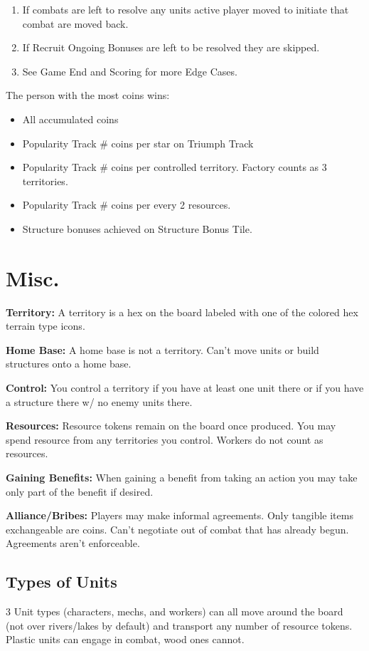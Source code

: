 \documentclass[12pt]{article}
\newenvironment{enumerateCustom}
{\begin{enumerate}
  \setlength{\itemsep}{1pt}
  \setlength{\parskip}{0pt}
  \setlength{\parsep}{0pt}}
{\end{enumerate}}
\newenvironment{itemizeCustom}
{\begin{itemize}
  \setlength{\itemsep}{1pt}
  \setlength{\parskip}{0pt}
  \setlength{\parsep}{0pt}}
{\end{itemize}}
\begin{document}
\begin{multicols*}{2}
\begin{enumerateCustom}
    \item If combats are left to resolve any units active player moved to initiate that combat are moved back.
    \item If Recruit Ongoing Bonuses are left to be resolved they are skipped.
    \item See Game End and Scoring for more Edge Cases.
\end{enumerateCustom}

The person with the most coins wins:
\begin{itemizeCustom}
    \item All accumulated coins
    \item Popularity Track \# coins per star on Triumph Track
    \item Popularity Track \# coins per controlled territory. Factory counts as 3 territories.
    \item Popularity Track \# coins per every 2 resources.
    \item Structure bonuses achieved on Structure Bonus Tile.
\end{itemizeCustom}

\section*{Misc.}
\textbf{Territory:} A territory is a hex on the board labeled with one of the colored hex terrain type icons.

\textbf{Home Base:} A home base is not a territory. Can't move units or build structures onto a home base.

\textbf{Control:} You control a territory if you have at least one unit there or if you have a structure there w/ no enemy units there.

\textbf{Resources:} Resource tokens remain on the board once produced. You may spend resource from any territories you control. Workers do not count as resources.

\textbf{Gaining Benefits:} When gaining a benefit from taking an action you may take only part of the benefit if desired.

\textbf{Alliance/Bribes:} Players may make informal agreements. Only tangible items exchangeable are coins. Can't negotiate out of combat that has already begun. Agreements aren't enforceable.

\subsection*{Types of Units}
3 Unit types (characters, mechs, and workers) can all move around the board (not over rivers/lakes by default) and transport any number of resource tokens. Plastic units can engage in combat, wood ones cannot.


\end{multicols*}
\end{document}
